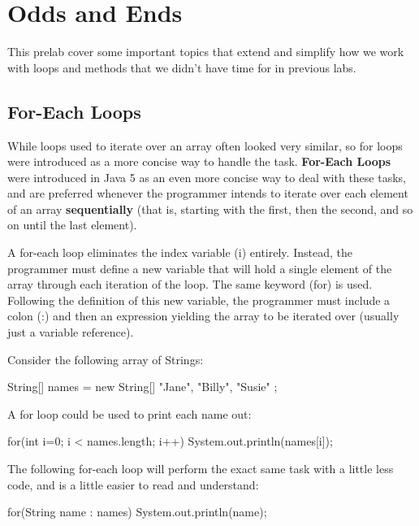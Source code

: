 
\section{Odds and Ends}

This prelab cover some important topics that extend and simplify how we work with loops and methods that we didn't have time for in previous labs. 

\subsection{For-Each Loops}

While loops used to iterate over an array often looked very similar, so for loops were introduced as a more concise way to handle the task. \textbf{For-Each Loops} were introduced in Java 5 as an even more concise way to deal with these tasks, and are preferred whenever the programmer intends to iterate over each element of an array \textbf{sequentially} (that is, starting with the first, then the second, and so on until the last element). 

A for-each loop eliminates the index variable (i) entirely. Instead, the programmer must define a new variable that will hold a single element of the array through each iteration of the loop. The same keyword (for) is used. Following the definition of this new variable, the programmer must include a colon (:) and then an expression yielding the array to be iterated over (usually just a variable reference).

\begin{exa}
Consider the following array of Strings:

\begin{code}
String[] names = new String[] { "Jane", "Billy", "Susie" };
\end{code}

A for loop could be used to print each name out:

\begin{code}
for(int i=0; i < names.length; i++) {
  System.out.println(names[i]);
}
\end{code}

The following for-each loop will perform the exact same task with a little less code, and is a little easier to read and understand:

\begin{code}
for(String name : names) {
  System.out.println(name);
}
\end{code}
\end{exa}



